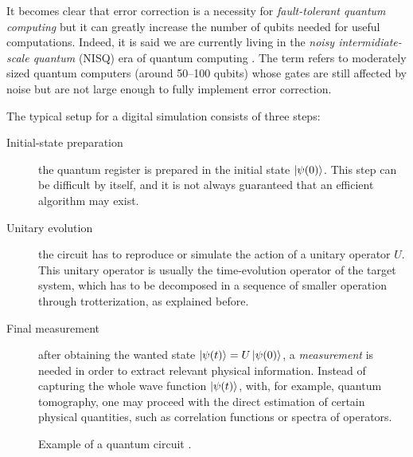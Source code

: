It becomes clear that error correction is a necessity for \emph{fault-tolerant quantum computing} \cite{preskill1997faulttolerant, shor1996faulttolerant} but it can greatly increase the number of qubits needed for useful computations.
Indeed, it is said we are currently living in the \emph{noisy intermidiate-scale quantum} (NISQ) era of quantum computing \cite{preskill2018quantumcomputing}.
The term refers to moderately sized quantum computers (around 50--100 qubits) whose gates are still affected by noise but are not large enough to fully implement error correction.

\medskip

The typical setup for a digital simulation consists of three steps:
\begin{description}
    \item[Initial-state preparation] the quantum register is prepared in the initial state $\ket{\psi(0)}$.
        This step can be difficult by itself, and it is not always guaranteed that an efficient algorithm may exist.

    \item[Unitary evolution]  the circuit has to reproduce or simulate the action of a unitary operator $U$.
        This unitary operator is usually the time-evolution operator of the target system, which has to be decomposed in a sequence of smaller operation through trotterization, as explained before.

    \item[Final measurement] after obtaining the wanted state $\ket{\psi(t)} = U \ket{\psi(0)}$, a \emph{measurement} is needed in order to extract relevant physical information.
        Instead of capturing the whole wave function $\ket{\psi(t)}$, with, for example, quantum tomography, one may proceed with the direct estimation of certain physical quantities, such as correlation functions or spectra of operators.
\end{description}



\begin{figure}[t]
    \centering
    \newcommand{\Gate}[3]{\draw[gate] (#1, -#2 + 0.25) rectangle ++(1.5, -#3 - 0.5);}
    \caption{Example of a quantum circuit .}
\end{figure}


